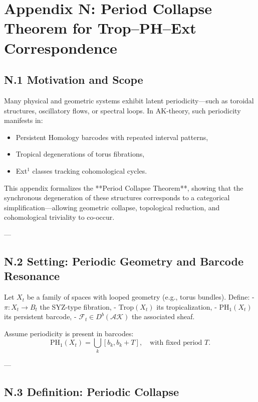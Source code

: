 \documentclass[11pt]{article}
\begin{document}


\section*{Appendix N: Period Collapse Theorem for Trop–PH–Ext Correspondence}

\subsection*{N.1 Motivation and Scope}

Many physical and geometric systems exhibit latent periodicity—such as toroidal structures, oscillatory flows, or spectral loops. In AK-theory, such periodicity manifests in:
\begin{itemize}
  \item Persistent Homology barcodes with repeated interval patterns,
  \item Tropical degenerations of torus fibrations,
  \item Ext$^1$ classes tracking cohomological cycles.
\end{itemize}

This appendix formalizes the **Period Collapse Theorem**, showing that the synchronous degeneration of these structures corresponds to a categorical simplification—allowing geometric collapse, topological reduction, and cohomological triviality to co-occur.

---

\subsection*{N.2 Setting: Periodic Geometry and Barcode Resonance}

Let $X_t$ be a family of spaces with looped geometry (e.g., torus bundles). Define:
- $\pi: X_t \to B_t$ the SYZ-type fibration,
- $\mathrm{Trop}(X_t)$ its tropicalization,
- $\mathrm{PH}_1(X_t)$ its persistent barcode,
- $\mathcal{F}_t \in D^b(\mathcal{AK})$ the associated sheaf.

Assume periodicity is present in barcodes:
\[
\mathrm{PH}_1(X_t) = \bigcup_{k} [b_k, b_k + T], \quad \text{with fixed period } T.
\]

---

\subsection*{N.3 Definition: Periodic Collapse}
\end{document}
